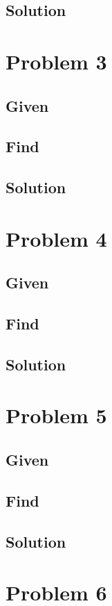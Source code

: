 \documentclass[a4paper,10pt]{article}
\begin{document}
\subsection{Solution}

\newpage
\section{Problem 3}
\subsection{Given}
\subsection{Find}
\subsection{Solution}

\newpage
\section{Problem 4}
\subsection{Given}
\subsection{Find}
\subsection{Solution}

\newpage
\section{Problem 5}
\subsection{Given}
\subsection{Find}
\subsection{Solution}

\newpage
\section{Problem 6}
\end{document}
